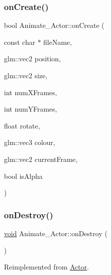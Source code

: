 \mbox{\label{classAnimate__Actor_a0e7160b050fd2baf26fa83890f58a154}} 
\subsubsection{\texorpdfstring{on\+Create()}{onCreate()}}
{\footnotesize\ttfamily bool Animate\+\_\+\+Actor\+::on\+Create (\begin{DoxyParamCaption}\item[{const char $\ast$}]{file\+Name,  }\item[{glm\+::vec2}]{position,  }\item[{glm\+::vec2}]{size,  }\item[{int}]{num\+X\+Frames,  }\item[{int}]{num\+Y\+Frames,  }\item[{float}]{rotate,  }\item[{glm\+::vec3}]{colour,  }\item[{glm\+::vec2}]{current\+Frame,  }\item[{bool}]{is\+Alpha }\end{DoxyParamCaption})}

\mbox{\label{classAnimate__Actor_ae67ff6399f3d46696f84c77b2e519ead}} 
\subsubsection{\texorpdfstring{on\+Destroy()}{onDestroy()}}
{\footnotesize\ttfamily \hyperlink{imgui__impl__opengl3__loader_8h_ac668e7cffd9e2e9cfee428b9b2f34fa7}{void} Animate\+\_\+\+Actor\+::on\+Destroy (\begin{DoxyParamCaption}{ }\end{DoxyParamCaption})\hspace{0.3cm}{\ttfamily [virtual]}}



Reimplemented from \hyperlink{classActor_a47101d6275509662bf6c84c3f3439696}{Actor}.

\mbox{\label{classAnimate__Actor_ad68bdde59414ac429d2268fb764261d2}} 
